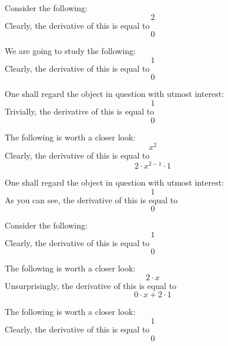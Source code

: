 \documentclass{article}
\begin{document}
Consider the following:
\begin{equation}
2 
\end{equation}
Clearly, the derivative of this is equal to
\begin{equation}
0 
\end{equation}

We are going to study the following:
\begin{equation}
1 
\end{equation}
Clearly, the derivative of this is equal to
\begin{equation}
0 
\end{equation}

One shall regard the object in question with utmost interest:
\begin{equation}
1 
\end{equation}
Trivially, the derivative of this is equal to
\begin{equation}
0 
\end{equation}

The following is worth a closer look:
\begin{equation}
x ^{2 } 
\end{equation}
Clearly, the derivative of this is equal to
\begin{equation}
2 \cdot x ^{2 - 1 } \cdot 1 
\end{equation}

One shall regard the object in question with utmost interest:
\begin{equation}
1 
\end{equation}
As you can see, the derivative of this is equal to
\begin{equation}
0 
\end{equation}

Consider the following:
\begin{equation}
1 
\end{equation}
Clearly, the derivative of this is equal to
\begin{equation}
0 
\end{equation}

The following is worth a closer look:
\begin{equation}
2 \cdot x 
\end{equation}
Unsurprisingly, the derivative of this is equal to
\begin{equation}
0 \cdot x + 2 \cdot 1 
\end{equation}

The following is worth a closer look:
\begin{equation}
1 
\end{equation}
Clearly, the derivative of this is equal to
\begin{equation}
0 
\end{equation}
\end{document}
